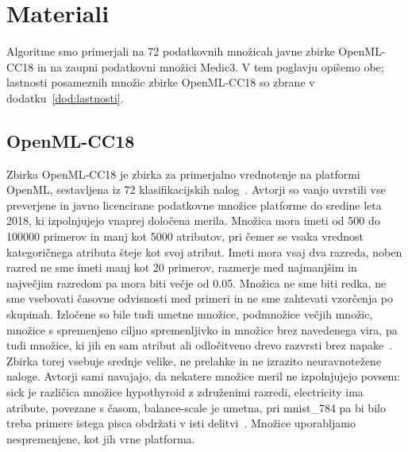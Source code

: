 \documentclass[a4paper,12pt,openright]{book}
\begin{document}
\chapter{Materiali}
\label{ch:podatki}

Algoritme smo primerjali na 72 podatkovnih množicah javne zbirke OpenML-CC18
in na zaupni podatkovni množici Medic3. V tem poglavju opišemo obe; lastnosti
posameznih množic zbirke OpenML-CC18 so zbrane v dodatku~\ref{dod:lastnosti}.

\section{OpenML-CC18}
\label{sec:cc18}

Zbirka OpenML-CC18 je zbirka za primerjalno vrednotenje na platformi OpenML,
sestavljena iz 72
klasifikacijskih nalog~\cite{bischl2021openml}. Avtorji so vanjo uvrstili vse
preverjene in javno licencirane podatkovne množice platforme do sredine leta
2018, ki izpolnjujejo vnaprej določena merila. Množica mora imeti od 500 do
\num{100000} primerov in manj kot 5000 atributov, pri čemer se vsaka vrednost
kategoričnega atributa šteje kot svoj atribut. Imeti mora vsaj dva razreda,
noben razred ne sme imeti manj kot 20 primerov, razmerje med najmanjšim in
največjim razredom pa mora biti večje od \num{0.05}. Množica ne sme biti
redka, ne sme vsebovati časovne odvisnosti med primeri in ne sme zahtevati
vzorčenja po skupinah. Izločene so bile tudi umetne množice, podmnožice večjih
množic, množice s spremenjeno ciljno spremenljivko in množice brez navedenega
vira, pa tudi množice, ki jih en sam atribut ali odločitveno drevo razvrsti
brez napake~\cite{bischl2021openml}. Zbirka torej vsebuje srednje velike, ne
prelahke in ne izrazito neuravnotežene naloge. Avtorji sami navajajo, da
nekatere množice meril ne izpolnjujejo povsem: sick je različica množice
hypothyroid z združenimi razredi, electricity ima atribute, povezane s časom,
balance-scale je umetna, pri mnist\_784 pa bi bilo treba primere istega pisca
obdržati v isti delitvi~\cite{bischl2021openml}. Množice uporabljamo
nespremenjene, kot jih vrne platforma.
\end{document}
